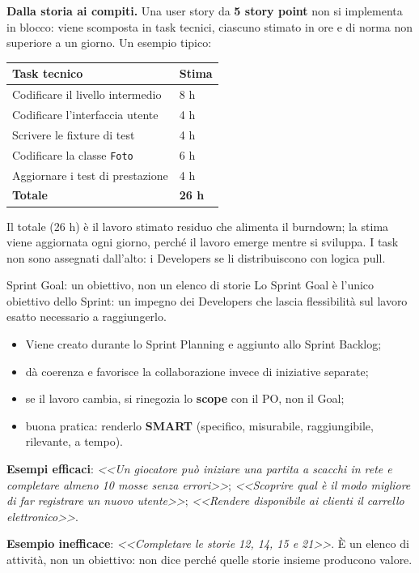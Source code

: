 \documentclass[12pt]{extarticle}
\begin{document}
\noindent \textbf{Dalla storia ai compiti.} Una user story da \textbf{5 story point} non si implementa in blocco: viene scomposta in task tecnici, ciascuno stimato in ore e di norma non superiore a un giorno. Un esempio tipico:
\begin{center}
\small
\begin{tabular}{p{9.0cm}p{2.0cm}}
    \toprule
    \textbf{Task tecnico} & \textbf{Stima} \\
    \midrule
    Codificare il livello intermedio & 8 h \\
    Codificare l'interfaccia utente & 4 h \\
    Scrivere le fixture di test & 4 h \\
    Codificare la classe \texttt{Foto} & 6 h \\
    Aggiornare i test di prestazione & 4 h \\
    \midrule
    \textbf{Totale} & \textbf{26 h} \\
    \bottomrule
\end{tabular}
\end{center}
\noindent Il totale (26 h) è il lavoro stimato residuo che alimenta il burndown; la stima viene aggiornata ogni giorno, perché il lavoro emerge mentre si sviluppa. I task non sono assegnati dall'alto: i Developers se li distribuiscono con logica pull.

\begin{cbox}{Sprint Goal: un obiettivo, non un elenco di storie}
Lo Sprint Goal è l'unico obiettivo dello Sprint: un impegno dei Developers che lascia flessibilità sul lavoro esatto necessario a raggiungerlo.
\begin{itemize}
    \item Viene creato durante lo Sprint Planning e aggiunto allo Sprint Backlog;
    \item dà coerenza e favorisce la collaborazione invece di iniziative separate;
    \item se il lavoro cambia, si rinegozia lo \textbf{scope} con il PO, non il Goal;
    \item buona pratica: renderlo \textbf{SMART} (specifico, misurabile, raggiungibile, rilevante, a tempo).
\end{itemize}
\medskip
\noindent \textbf{Esempi efficaci}: \textit{<<Un giocatore può iniziare una partita a scacchi in rete e completare almeno 10 mosse senza errori>>}; \textit{<<Scoprire qual è il modo migliore di far registrare un nuovo utente>>}; \textit{<<Rendere disponibile ai clienti il carrello elettronico>>}.
\medskip

\noindent \textbf{Esempio inefficace}: \textit{<<Completare le storie 12, 14, 15 e 21>>}. È un elenco di attività, non un obiettivo: non dice perché quelle storie insieme producono valore.
\end{cbox}
\end{document}
